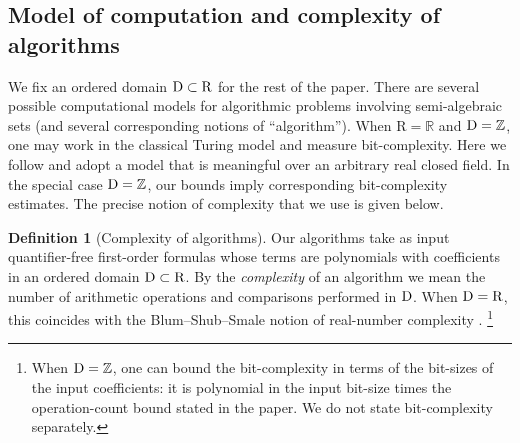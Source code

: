 \documentclass{amsart}[10pts]
\theoremstyle{definition}
\newtheorem{definition}{Definition}[section]
\theoremstyle{remark}
\theoremstyle{observation}
\numberwithin{equation}{section}
\newcommand {\R} {\mathrm{R}}
\newcommand {\D}     {\mbox{\rm D}}
\newcommand {\Z}  {\mathbb{Z}}
\begin{document}
\subsection{Model of computation and complexity of algorithms}
\label{subsec:complexity:algorithms}
We fix an ordered domain $\D\subset \R$ for the rest of the paper.
There are several possible computational models for algorithmic problems involving semi-algebraic sets (and several corresponding notions of ``algorithm'').
When $\R=\mathbb R$ and $\D=\mathbb Z$, one may work in the classical Turing model and measure bit-complexity.
Here we follow \cite{BPRbook2} and adopt a model that is meaningful over an arbitrary real closed field.
In the special case $\D=\mathbb Z$, our bounds imply corresponding bit-complexity estimates. The precise notion of complexity that we use is given below.

\begin{definition}[Complexity of algorithms]
\label{def:complexity}
Our algorithms take as input quantifier-free first-order formulas whose terms are polynomials with coefficients in an ordered domain $\D\subset \R$.
By the \emph{complexity} of an algorithm we mean the number of arithmetic operations and comparisons performed in $\D$.
When $\D=\R$, this coincides with the Blum--Shub--Smale notion of real-number complexity \cite{BSS}.
\footnote{When $\D=\Z$, one can bound the bit-complexity in terms of the bit-sizes of the input coefficients: it is polynomial in the input bit-size times the operation-count bound stated in the paper. We do not state bit-complexity separately.}
\end{definition}
\end{document}
